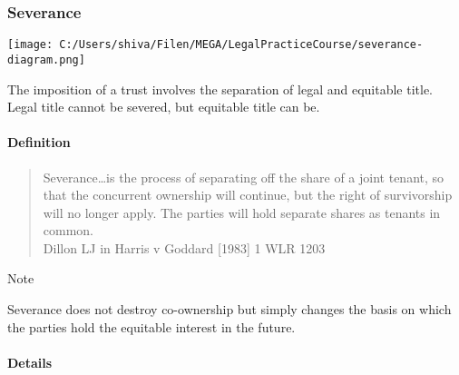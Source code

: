 \documentclass[
]{article}
\newenvironment{env-881a4bd6-779e-4404-ae5b-86f77846f864}
{
    \savenotes\tcolorbox[blanker,breakable,left=5pt,borderline west={2pt}{-4pt}{blue}]
}
{
    \endtcolorbox\spewnotes
}
\begin{document}
\hypertarget{severance}{%
\subsubsection{Severance}\label{severance}}

\texttt{[image: C:/Users/shiva/Filen/MEGA/LegalPracticeCourse/severance-diagram.png]}

The imposition of a trust involves the separation of legal and equitable
title. Legal title cannot be severed, but equitable title can be.

\hypertarget{definition-1}{%
\paragraph{Definition}\label{definition-1}}

\begin{quote}
Severance\ldots is the process of separating off the share of a joint
tenant, so that the concurrent ownership will continue, but the right of
survivorship will no longer apply. The parties will hold separate shares
as tenants in common.\\
Dillon LJ in Harris v Goddard {[}1983{]} 1 WLR 1203
\end{quote}

\begin{env-881a4bd6-779e-4404-ae5b-86f77846f864}

Note

Severance does not destroy co-ownership but simply changes the basis on
which the parties hold the equitable interest in the future.

\end{env-881a4bd6-779e-4404-ae5b-86f77846f864}

\hypertarget{details}{%
\paragraph{Details}\label{details}}
\end{document}
